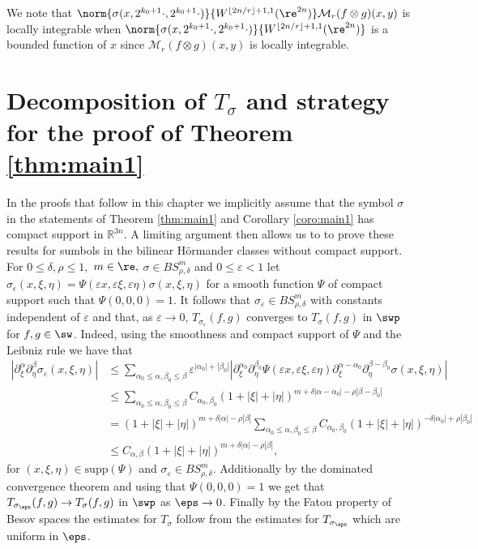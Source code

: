 \begin{remark}\label{remark:locint}
We note that $\norm{\sigma(x, 2^{k_0+1} \cdot, 2^{k_0+1} \cdot)}{W^{\lfloor{2n/r}\rfloor + 1,1}(\re^{2n})} \mathcal{M}_r(f\otimes g)(x,y) $ is locally integrable when  $\norm{\sigma(x, 2^{k_0+1} \cdot, 2^{k_0+1} \cdot)}{W^{\lfloor{2n/r}\rfloor + 1,1}(\re^{2n})}$ is a bounded function of $x$ since $\mathcal{M}_r(f\otimes g)(x,y)$ is locally integrable.
\end{remark}


\section{Decomposition of $T_\sigma$ and strategy for the proof of Theorem \ref{thm:main1}}\label{sec:decomp}
In the proofs that follow in this chapter we implicitly assume that the symbol $\sigma$ in the statements of Theorem \ref{thm:main1} and Corollary \ref{coro:main1} has compact support in $\mathbb{R}^{3n}$. A limiting argument then allows us to to prove these results for sumbols in the bilinear H\"ormander classes without compact support. For $0\le \delta,\rho\le 1,$ $m\in\re,$ $\sigma\in BS^m_{\rho,\delta}$ and $0\le \varepsilon<1$ let $\sigma_\epsilon (x,\xi,\eta) = \Psi(\varepsilon x, \varepsilon \xi, \varepsilon \eta) \sigma( x, \xi,\eta)$ for a smooth  function $\Psi$ of compact support such that $\Psi(0,0,0) = 1$. It follows that $\sigma_\varepsilon \in BS^m_{\rho,\delta}$ with constants independent of $\varepsilon$ and that, as $\varepsilon \rightarrow 0$, $T_{\sigma_\varepsilon}(f,g)$ converges to $T_\sigma(f,g)$ in $\swp$ for $f,g \in \sw$. Indeed, using the smoothness and compact support of $\Psi$ and the Leibniz rule we have that 
\begin{align*}
|\partial^\alpha_\xi \partial^\beta_\eta \sigma_\varepsilon(x,\xi,\eta)| & 
\leq \sum_{\alpha_0 \leq \alpha, \beta_0 \leq \beta} \varepsilon^{|\alpha_0| + |\beta_0|}|\partial^{\alpha_0}_\xi \partial^{\beta_0}_\eta \Psi(\varepsilon x, \varepsilon \xi, \varepsilon \eta) \partial^{\alpha - \alpha_0}_\xi \partial^{\beta - \beta_0}_\eta \sigma(x,\xi,\eta) | \\
& \leq \sum_{\alpha_0 \leq \alpha, \beta_0 \leq \beta} C_{\alpha_0 , \beta_0} (1 + |\xi| + |\eta|)^{m + \delta|\alpha - \alpha_0| - \rho|\beta - \beta_0|} \\
& =(1 + |\xi| + |\eta|)^{m + \delta|\alpha| - \rho|\beta|} \sum_{\alpha_0 \leq \alpha, \beta_0 \leq \beta} C_{\alpha_0 , \beta_0} (1 + |\xi| + |\eta|)^{-\delta| \alpha_0| + \rho|\beta_0|} \\
& \leq C_{\alpha,\beta} (1 + |\xi| + |\eta|)^{m + \delta|\alpha| - \rho|\beta|},
\end{align*}
for $(x,\xi,\eta) \in \text{supp}(\Psi)$ and $\sigma_\varepsilon \in BS^m_{\rho,\delta}$. Additionally by the dominated convergence theorem and using that  $\Psi(0,0,0) = 1$ we get that $T_{\sigma_\eps}(f,g) \rightarrow T_\sigma(f,g)$ in $\swp$ as $\eps \rightarrow 0$. Finally by the Fatou property of Besov spaces the estimates for $T_\sigma$ follow from the estimates for $T_{\sigma_\eps}$ which are uniform in $\eps$. 

